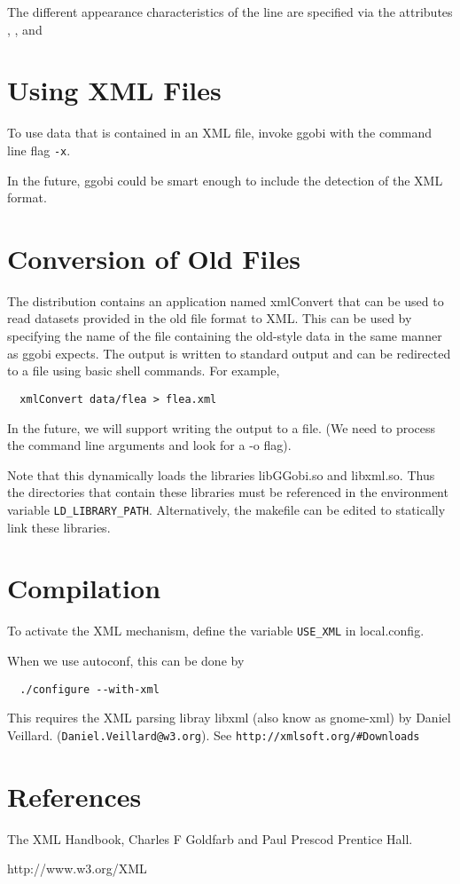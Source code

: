 \documentclass{article}
\begin{document}
The different appearance characteristics of the line
are specified via
the attributes
, 
,
and






\section{Using XML Files}
To use data that is contained in an XML file, invoke ggobi with the
command line flag \texttt{-x}.

In the future, ggobi could be smart enough to include the detection of
the XML format.



\section{Conversion of Old Files}
The distribution contains an application named xmlConvert that can be
used to read datasets provided in the old file format to XML.  This
can be used by specifying the name of the file containing the
old-style data in the same manner as ggobi expects.
The output is written to standard output
and can be redirected to a file using basic shell commands.
For example,
\begin{verbatim}
  xmlConvert data/flea > flea.xml
\end{verbatim}
In the future, we will support writing the output to a file. (We need
to process the command line arguments and look for a -o flag).


Note that this dynamically loads the libraries libGGobi.so and
libxml.so.  Thus the directories that contain these libraries must be
referenced in the environment variable 
\texttt{LD_LIBRARY_PATH}.
Alternatively, the makefile can be edited to statically link these
libraries.


\section{Compilation}
To activate the XML mechanism, define the variable
\texttt{USE_XML} in  local.config.

When we use autoconf, this can be done by
\begin{verbatim}
  ./configure --with-xml
\end{verbatim}

This requires the XML parsing libray libxml (also know as gnome-xml) by Daniel Veillard.
(\texttt{Daniel.Veillard@w3.org}).
See \texttt{http://xmlsoft.org/#Downloads}
\section{References}
The XML Handbook, Charles F Goldfarb and Paul Prescod
 Prentice Hall.

http://www.w3.org/XML
\end{document}
